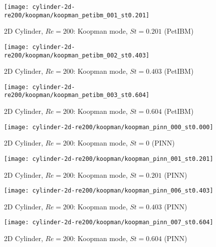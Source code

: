 \begin{figure}[hbt!]
    \centering
    \texttt{[image: cylinder-2d-re200/koopman/koopman\_petibm\_001\_st0.201]}
    \caption{2D Cylinder, $Re=200$: Koopman mode, $St=0.201$ (PetIBM)}
    \label{fig:koopman-petibm-mode-2}
\end{figure}

\begin{figure}[hbt!]
    \centering
    \texttt{[image: cylinder-2d-re200/koopman/koopman\_petibm\_002\_st0.403]}
    \caption{2D Cylinder, $Re=200$: Koopman mode, $St=0.403$ (PetIBM)}
    \label{fig:koopman-petibm-mode-3}
\end{figure}

\begin{figure}[hbt!]
    \centering
    \texttt{[image: cylinder-2d-re200/koopman/koopman\_petibm\_003\_st0.604]}
    \caption{2D Cylinder, $Re=200$: Koopman mode, $St=0.604$ (PetIBM)}
    \label{fig:koopman-petibm-mode-4}
\end{figure}

\begin{figure}[hbt!]
    \centering
    \texttt{[image: cylinder-2d-re200/koopman/koopman\_pinn\_000\_st0.000]}
    \caption{2D Cylinder, $Re=200$: Koopman mode, $St=0$ (PINN)}
    \label{fig:koopman-pinn-undamped-mode-1}
\end{figure}

\begin{figure}[hbt!]
    \centering
    \texttt{[image: cylinder-2d-re200/koopman/koopman\_pinn\_001\_st0.201]}
    \caption{2D Cylinder, $Re=200$: Koopman mode, $St=0.201$ (PINN)}
    \label{fig:koopman-pinn-undamped-mode-2}
\end{figure}

\begin{figure}[hbt!]
    \centering
    \texttt{[image: cylinder-2d-re200/koopman/koopman\_pinn\_006\_st0.403]}
    \caption{2D Cylinder, $Re=200$: Koopman mode, $St=0.403$ (PINN)}
    \label{fig:koopman-pinn-undamped-mode-3}
\end{figure}

\begin{figure}[hbt!]
    \centering
    \texttt{[image: cylinder-2d-re200/koopman/koopman\_pinn\_007\_st0.604]}
    \caption{2D Cylinder, $Re=200$: Koopman mode, $St=0.604$ (PINN)}
    \label{fig:koopman-pinn-undamped-mode-4}
\end{figure}

